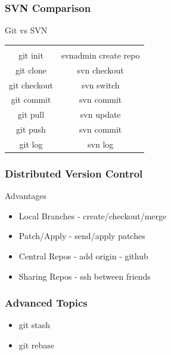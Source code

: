 \documentclass[10pt]{beamer}
\begin{document}
\begin{frame}
    \frametitle{SVN Comparison}
    \begin{block}{Git vs SVN}
        \begin{table}[h]
            \centering
            \begin{tabular}{|c|c|}
                \hline
                & \\ [-1ex]
                git init & svnadmin create repo \\[.25ex]
                \hline
                git clone & svn checkout \\[.25ex]
                \hline
                git checkout & svn switch \\[.25ex]
                \hline
                git commit  & svn commit \\[.25ex]
                \hline
                git pull  & svn update \\[.25ex]
                \hline
                git push  & svn commit \\[.25ex]
                \hline
                git log  & svn log \\[.25ex]
                \hline
            \end{tabular}
        \end{table}
    \end{block}
\end{frame}

\begin{frame}
    \frametitle{Distributed Version Control}
    \begin{block}{Advantages}
        \begin{itemize}
            \item Local Branches - create/checkout/merge
            \item Patch/Apply - send/apply patches
            \item Central Repos - add origin - github
            \item Sharing Repos - ssh between friends
        \end{itemize}
    \end{block}
\end{frame}

\begin{frame}
    \frametitle{Advanced Topics}
    \begin{block}{}
        \begin{itemize}
            \item git stash
            \item git rebase
        \end{itemize}
    \end{block}
\end{frame}
\end{document}
